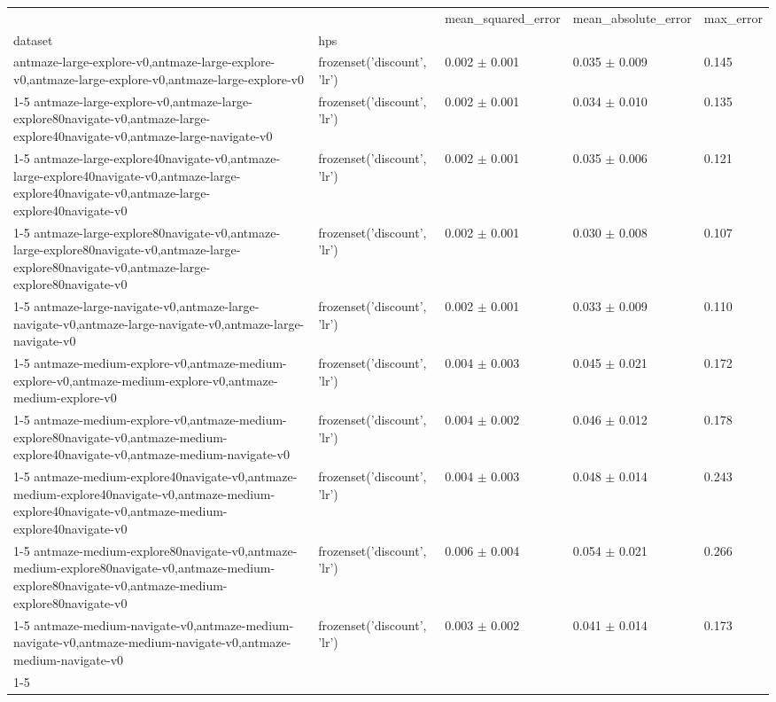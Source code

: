 \begin{tabular}{lllll}
\toprule
 &  & mean_squared_error & mean_absolute_error & max_error \\
dataset & hps &  &  &  \\
\midrule
antmaze-large-explore-v0,antmaze-large-explore-v0,antmaze-large-explore-v0,antmaze-large-explore-v0 & frozenset({'discount', 'lr'}) & 0.002 $\pm$ 0.001 & 0.035 $\pm$ 0.009 & 0.145 \\
\cline{1-5}
antmaze-large-explore-v0,antmaze-large-explore80navigate-v0,antmaze-large-explore40navigate-v0,antmaze-large-navigate-v0 & frozenset({'discount', 'lr'}) & 0.002 $\pm$ 0.001 & 0.034 $\pm$ 0.010 & 0.135 \\
\cline{1-5}
antmaze-large-explore40navigate-v0,antmaze-large-explore40navigate-v0,antmaze-large-explore40navigate-v0,antmaze-large-explore40navigate-v0 & frozenset({'discount', 'lr'}) & 0.002 $\pm$ 0.001 & 0.035 $\pm$ 0.006 & 0.121 \\
\cline{1-5}
antmaze-large-explore80navigate-v0,antmaze-large-explore80navigate-v0,antmaze-large-explore80navigate-v0,antmaze-large-explore80navigate-v0 & frozenset({'discount', 'lr'}) & 0.002 $\pm$ 0.001 & 0.030 $\pm$ 0.008 & 0.107 \\
\cline{1-5}
antmaze-large-navigate-v0,antmaze-large-navigate-v0,antmaze-large-navigate-v0,antmaze-large-navigate-v0 & frozenset({'discount', 'lr'}) & 0.002 $\pm$ 0.001 & 0.033 $\pm$ 0.009 & 0.110 \\
\cline{1-5}
antmaze-medium-explore-v0,antmaze-medium-explore-v0,antmaze-medium-explore-v0,antmaze-medium-explore-v0 & frozenset({'discount', 'lr'}) & 0.004 $\pm$ 0.003 & 0.045 $\pm$ 0.021 & 0.172 \\
\cline{1-5}
antmaze-medium-explore-v0,antmaze-medium-explore80navigate-v0,antmaze-medium-explore40navigate-v0,antmaze-medium-navigate-v0 & frozenset({'discount', 'lr'}) & 0.004 $\pm$ 0.002 & 0.046 $\pm$ 0.012 & 0.178 \\
\cline{1-5}
antmaze-medium-explore40navigate-v0,antmaze-medium-explore40navigate-v0,antmaze-medium-explore40navigate-v0,antmaze-medium-explore40navigate-v0 & frozenset({'discount', 'lr'}) & 0.004 $\pm$ 0.003 & 0.048 $\pm$ 0.014 & 0.243 \\
\cline{1-5}
antmaze-medium-explore80navigate-v0,antmaze-medium-explore80navigate-v0,antmaze-medium-explore80navigate-v0,antmaze-medium-explore80navigate-v0 & frozenset({'discount', 'lr'}) & 0.006 $\pm$ 0.004 & 0.054 $\pm$ 0.021 & 0.266 \\
\cline{1-5}
antmaze-medium-navigate-v0,antmaze-medium-navigate-v0,antmaze-medium-navigate-v0,antmaze-medium-navigate-v0 & frozenset({'discount', 'lr'}) & 0.003 $\pm$ 0.002 & 0.041 $\pm$ 0.014 & 0.173 \\
\cline{1-5}
\bottomrule
\end{tabular}
